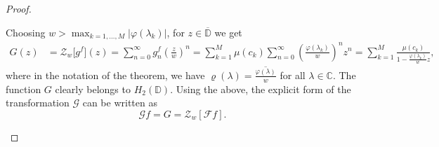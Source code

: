 \documentclass[10pt,a4paper]{amsart}
\begin{document}
\begin{proof}
\begin{enumerate}[label = \alph*)]
Choosing $w > \max_{k=1,\ldots,M} |\varphi(\lambda_k)|$, for $z \in \overline{\mathbb{D}}$ we get
\begin{align*}
    \label{eq:h2form}
         G(z) &= \mathcal{Z}_{w} \big[g^f\big] (z) = \sum_{n=0}^{\infty} g^f_n \left( \frac{z}{w} \right)^n = \sum_{k=1}^{M} \mu(c_k) \sum_{n=0}^{\infty} \left( \frac{\varphi(\lambda_k)}{w} \right)^n z^n =\sum_{k=1}^{M} \frac{\mu(c_k)}{1 - {\frac{\varphi(\lambda_k)}{w}}z},
\end{align*}
where in the notation of the theorem, we have $\varrho(\lambda) = \overline{\frac{\varphi(\lambda)}{w}}$ for all $\lambda \in \mathbb{C}$.
The function $G$ clearly belongs to $H_2(\mathbb{D})$. Using the above, the explicit form of the transformation $\mathcal{G}$ can be written as
\begin{equation*}
 \mathcal{G}f = G = \mathcal{Z}_w[\mathcal{F}f].
\end{equation*}
\end{enumerate}

\end{proof}
\end{document}
